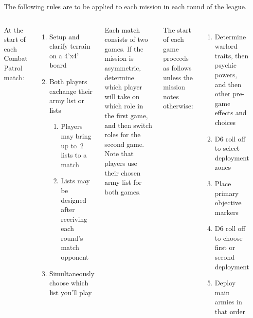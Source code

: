 \clearpage
{}

The following rules are to be applied to each mission in each round of
the league.

\begin{columns}
  

At the start of each Combat Patrol match:

\begin{enumerate}\shortlist
\item Setup and clarify terrain on a 4'x4' board

\item Both players exchange their army list or lists
  \begin{enumerate}
  \item Players may bring up to~2 lists to a match
  \item Lists may be designed after receiving each round's match
    opponent
  \end{enumerate}

\item Simultaneously choose which list you'll play
\end{enumerate}

\bigskip\noindent Each match consists of two games.  If the mission is
asymmetric, determine which player will take on which role in the
first game, and then switch roles for the second game.  Note that
players use their chosen army list for both games.

\bigskip
The start of each game proceeds as follows unless the mission notes
otherwise:

\begin{enumerate}\shortlist
\item Determine warlord traits, then psychic powers, and then other
  pre-game effects and choices

\item D6 roll off to select deployment zones

\item Place primary objective markers

\item D6 roll off to choose first or second deployment

\item Deploy main armies in that order


\end{enumerate}
\end{columns}
